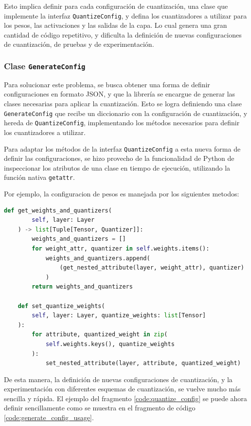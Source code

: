 Esto implica definir para cada configuración de cuantización, una clase que implemente la interfaz \texttt{QuantizeConfig}, y defina los cuantizadores a utilizar para los pesos, las activaciones y las salidas de la capa. Lo cual genera una gran cantidad de código repetitivo, y dificulta la definición de nuevas configuraciones de cuantización, de pruebas y de experimentación.

\subsubsection{Clase \texttt{GenerateConfig}}
\label{sec:generate_config}
Para solucionar este problema, se busca obtener una forma de definir configuraciones en formato JSON, y que la librería se encargue de generar las clases necesarias para aplicar la cuantización. Esto se logra definiendo una clase \texttt{GenerateConfig} que recibe un diccionario con la configuración de cuantización, y hereda de \texttt{QuantizeConfig}, implementando los métodos necesarios para definir los cuantizadores a utilizar.

Para adaptar los métodos de la interfaz \texttt{QuantizeConfig} a esta nueva forma de definir las configuraciones, se hizo provecho de la funcionalidad de Python de inspeccionar los atributos de una clase en tiempo de ejecución, utilizando la función nativa \texttt{getattr}.

Por ejemplo, la configuracion de pesos es manejada por los siguientes metodos:

\begin{lstlisting}[language=Python,label=code:generate_config,caption=Metodos para cuantizar los pesos]
    def get_weights_and_quantizers(
        self, layer: Layer
    ) -> list[Tuple[Tensor, Quantizer]]:
        weights_and_quantizers = []
        for weight_attr, quantizer in self.weights.items():
            weights_and_quantizers.append(
                (get_nested_attribute(layer, weight_attr), quantizer)
            )
        return weights_and_quantizers

    def set_quantize_weights(
        self, layer: Layer, quantize_weights: list[Tensor]
    ):
        for attribute, quantized_weight in zip(
            self.weights.keys(), quantize_weights
        ):
            set_nested_attribute(layer, attribute, quantized_weight)

\end{lstlisting}

De esta manera, la definición de nuevas configuraciones de cuantización, y la experimentación con diferentes esquemas de cuantización, se vuelve mucho más sencilla y rápida. El ejemplo del fragmento \ref{code:quantize_config} se puede ahora definir sencillamente como se muestra en el fragmento de código \ref{code:generate_config_usage}.

